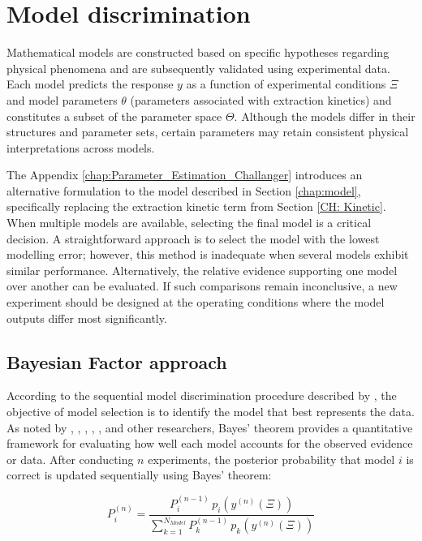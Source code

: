 \documentclass[../Article_Design_of_Experiment.tex]{subfiles}
\begin{document}
	
\section{Model discrimination} \label{chap:DOE_discrimination}

Mathematical models are constructed based on specific hypotheses regarding physical phenomena and are subsequently validated using experimental data. Each model predicts the response $y$ as a function of experimental conditions $\Xi$ and model parameters $\theta$ (parameters associated with extraction kinetics) and constitutes a subset of the parameter space $\Theta$. Although the models differ in their structures and parameter sets, certain parameters may retain consistent physical interpretations across models.

The Appendix \ref{chap:Parameter_Estimation_Challanger} introduces an alternative formulation to the model described in Section \ref{chap:model}, specifically replacing the extraction kinetic term from Section \ref{CH: Kinetic}. When multiple models are available, selecting the final model is a critical decision. A straightforward approach is to select the model with the lowest modelling error; however, this method is inadequate when several models exhibit similar performance. Alternatively, the relative evidence supporting one model over another can be evaluated. If such comparisons remain inconclusive, a new experiment should be designed at the operating conditions where the model outputs differ most significantly. 

\subsection{Bayesian Factor approach} \label{sec:Bayesian_Factor}

According to the sequential model discrimination procedure described by \citet{Box1967}, the objective of model selection is to identify the model that best represents the data. As noted by \citet{Box1967}, \citet{Kass1995}, \citet{Bishop2008}, \citet{Rasmussen2006}, \citet{Himmelblau1970}, and other researchers, Bayes' theorem provides a quantitative framework for evaluating how well each model accounts for the observed evidence or data. After conducting $n$ experiments, the posterior probability that model $i$ is correct is updated sequentially using Bayes' theorem:

{\footnotesize
	\begin{equation}
		P_i^{(n)} = \frac{P_i^{(n-1)} \, p_i(y^{(n)}(\Xi))}{\displaystyle\sum_{k=1}^{N_{Model}} P_k^{(n-1)} \, p_k(y^{(n)}(\Xi))}
		\label{eq:posterior}
\end{equation}}
\end{document}

